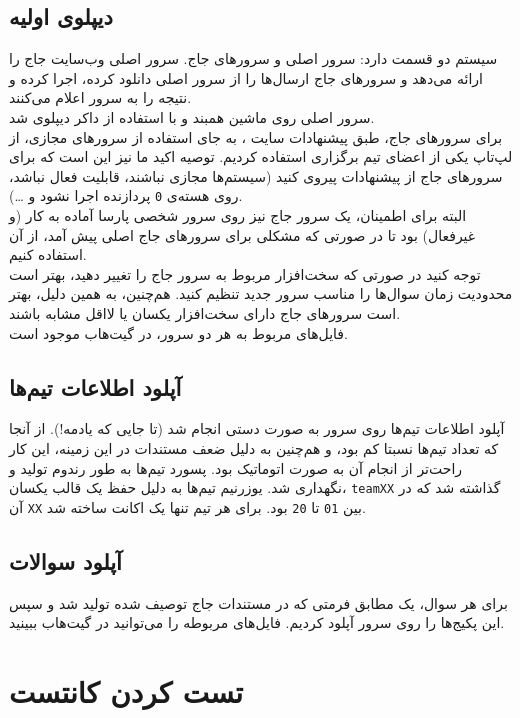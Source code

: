 \documentclass{report}
\begin{document}
\subsection{دیپلوی اولیه}
سیستم  دو قسمت دارد: سرور اصلی و سرورهای جاج. سرور اصلی وب‌سایت جاج را ارائه می‌دهد و سرورهای جاج ارسال‌ها را از سرور اصلی دانلود کرده، اجرا کرده و نتیجه را به سرور اعلام می‌کنند. \\
سرور اصلی روی ماشین همبند و با استفاده از داکر دیپلوی شد. \\
برای سرورهای جاج، طبق پیشنهادات سایت ، به جای استفاده از سرورهای مجازی، از لپ‌تاپ یکی از اعضای تیم برگزاری استفاده کردیم. توصیه اکید ما نیز این است که برای سرورهای جاج از پیشنهادات  پیروی کنید (سیستم‌ها مجازی نباشند، قابلیت  فعال نباشد، روی هسته‌ی \verb|0| پردازنده اجرا نشود و \dots). \\
البته برای اطمینان، یک سرور جاج نیز روی سرور شخصی پارسا آماده به کار (و غیرفعال) بود تا در صورتی که مشکلی برای سرورهای جاج اصلی پیش آمد، از آن استفاده کنیم. \\
توجه کنید در صورتی که سخت‌افزار مربوط به سرور جاج را تغییر دهید، بهتر است محدودیت زمان سوال‌ها را مناسب سرور جدید تنظیم کنید. هم‌چنین، به همین دلیل، بهتر است سرورهای جاج دارای سخت‌افزار یکسان یا لااقل مشابه باشند. \\

فایل‌های  مربوط به هر دو سرور، در گیت‌هاب موجود است.

\subsection{آپلود اطلاعات تیم‌ها}
آپلود اطلاعات تیم‌ها روی سرور به صورت دستی انجام شد (تا جایی که یادمه!). از آنجا که تعداد تیم‌ها نسبتا کم بود، و هم‌چنین به دلیل ضعف مستندات  در این زمینه، این کار راحت‌تر از انجام آن به صورت اتوماتیک بود. پسورد تیم‌ها به طور رندوم تولید و نگهداری شد. یوزرنیم تیم‌ها به دلیل حفظ یک قالب یکسان، \verb|teamXX| گذاشته شد که در آن \verb|XX| بین \verb|01| تا \verb|20| بود. برای هر تیم تنها یک اکانت ساخته شد.

\subsection{آپلود سوالات}
برای هر سوال، یک  مطابق فرمتی که در مستندات جاج توصیف شده تولید شد و سپس این پکیج‌ها را روی سرور آپلود کردیم. فایل‌های مربوطه را می‌توانید در گیت‌هاب ببینید.


\section{تست کردن کانتست}
\end{document}
